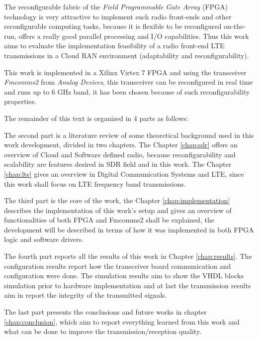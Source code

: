 The reconfigurable fabric of the \textit{Field Programmable Gate Array} (FPGA)
technology is very attractive to implement such radio front-ends and other
reconfigurable computing tasks, because it is flexible to be reconfigured
on-the-run, offers a really good parallel processing and I/O capabilities. Thus
this work aims to evaluate the implementation feasibility of a radio front-end
LTE transmissions in a Cloud RAN environment (adaptability and
reconfigurability).

This work is implemented in a Xilinx Virtex 7 FPGA and using the transceiver
\textit{Fmcomms2} from \textit{Analog Devices}, this transceiver can be
reconfigured in real time and runs up to 6 GHz band, it has been chosen because
of such reconfigurability properties.

The remainder of this text is organized in 4 parts as follows:

The second part is a literature review of some theoretical background used in
this work development, divided in two chapters. The Chapter \ref{chap:sdr}
offers an overview of Cloud and Software defined radio, because
reconfigurability and scalability are features desired in SDR field and in this
work. The Chapter \ref{chap:lte} gives an overview in Digital Communication
Systems and LTE, since this work shall focus on LTE  frequency band
transmissions.

The third part is the core of the work, the Chapter \ref{chap:implementation}
describes the implementation of this work's setup and gives an overview of
functionalities of both FPGA and Fmcomms2 shall be explained, the
development will be described in terms of how it was implemented in both FPGA
logic and software drivers.

The fourth part reports all the results of this work in Chapter
\ref{chap:results}. The configuration results report how the transceiver board
communication and configuration were done. The simulation results aim to show
the VHDL blocks simulation prior to hardware implementation and at last the
transmission results aim in report the integrity of the transmitted signals.

The last part presents the conclusions and future works in chapter
\ref{chap:conclusion}, which aim to report everything learned from this work and
what can be done to improve the transmission/reception quality.
